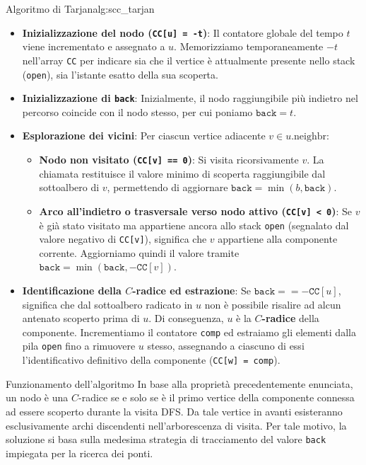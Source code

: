 \documentclass[12pt]{report}
\begin{document}
	\begin{algoritmo}{Algoritmo di Tarjan}{alg:scc_tarjan}
		\begin{itemize}
			\item \textbf{Inizializzazione del nodo (\texttt{CC[u] = -t})}: Il contatore globale del tempo $t$ viene incrementato e assegnato a $u$. Memorizziamo temporaneamente $-t$ nell'array \texttt{CC} per indicare sia che il vertice è attualmente presente nello stack (\texttt{open}), sia l'istante esatto della sua scoperta.
			
			\item \textbf{Inizializzazione di \texttt{back}}: Inizialmente, il nodo raggiungibile più indietro nel percorso coincide con il nodo stesso, per cui poniamo $\texttt{back} = t$.
			
			\item \textbf{Esplorazione dei vicini}: Per ciascun vertice adiacente $v \in u.\text{neighbr}$:
			\begin{itemize}
				\item \textbf{Nodo non visitato (\texttt{CC[v] == 0})}: Si visita ricorsivamente $v$. La chiamata restituisce il valore minimo di scoperta raggiungibile dal sottoalbero di $v$, permettendo di aggiornare $\texttt{back} = \min(b, \texttt{back})$.
				\item \textbf{Arco all'indietro o trasversale verso nodo attivo (\texttt{CC[v] < 0})}: Se $v$ è già stato visitato ma appartiene ancora allo stack \texttt{open} (segnalato dal valore negativo di \texttt{CC[v]}), significa che $v$ appartiene alla componente corrente. Aggiorniamo quindi il valore tramite $\texttt{back} = \min(\texttt{back}, -\texttt{CC}[v])$.
			\end{itemize}
			
			\item \textbf{Identificazione della $C$-radice ed estrazione}: Se $\texttt{back} == -\texttt{CC}[u]$, significa che dal sottoalbero radicato in $u$ non è possibile risalire ad alcun antenato scoperto prima di $u$. Di conseguenza, $u$ è la \textbf{$C$-radice} della componente. Incrementiamo il contatore \texttt{comp} ed estraiamo gli elementi dalla pila \texttt{open} fino a rimuovere $u$ stesso, assegnando a ciascuno di essi l'identificativo definitivo della componente (\texttt{CC[w] = comp}).
		\end{itemize}
	\end{algoritmo}
	
	\begin{osservazione}{Funzionamento dell'algoritmo}{}
		In base alla proprietà precedentemente enunciata, un nodo è una $C$-radice se e solo se è il primo vertice della componente connessa ad essere scoperto durante la visita DFS. Da tale vertice in avanti esisteranno esclusivamente archi discendenti nell'arborescenza di visita. Per tale motivo, la soluzione si basa sulla medesima strategia di tracciamento del valore \texttt{back} impiegata per la ricerca dei ponti.
	\end{osservazione}
	
\end{document}
